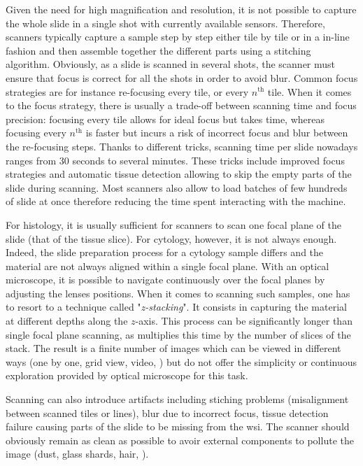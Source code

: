 Given the need for high magnification and resolution, it is not possible to capture the whole slide in a single shot with currently available sensors. Therefore, scanners typically capture a sample step by step either tile by tile or in a in-line fashion and then assemble together the different parts using a stitching algorithm. Obviously, as a slide is scanned in several shots, the scanner must ensure that focus is correct for all the shots in order to avoid blur. Common focus strategies are for instance re-focusing every tile, or every $n^{\text{th}}$ tile. When it comes to the focus strategy, there is usually a trade-off between scanning time and focus precision: focusing every tile allows for ideal focus but takes time, whereas focusing every $n^{\text{th}}$ is faster but incurs a risk of incorrect focus and blur between the re-focusing steps. Thanks to different tricks, scanning time per slide nowadays ranges from 30 seconds to several minutes. These tricks include improved focus strategies and automatic tissue detection allowing to skip the empty parts of the slide during scanning. Most scanners also allow to load batches of few hundreds of slide at once therefore reducing the time spent interacting with the machine.

For histology, it is usually sufficient for scanners to scan one focal plane of the slide (\ie that of the tissue slice). For cytology, however, it is not always enough. Indeed, the slide preparation process for a cytology sample differs and the material are not always aligned within a single focal plane. With an optical microscope, it is possible to navigate continuously over the focal planes by adjusting the lenses positions. When it comes to scanning such samples, one has to resort to a technique called "\textit{z-stacking}". It consists in capturing the material at different depths along the $z$-axis. This process can be significantly longer than single focal plane scanning, as multiplies this time by the number of slices of the stack. The result is a finite number of images which can be viewed in different ways (\eg one by one, grid view, video, \etc) but do not offer the simplicity or continuous exploration provided by optical microscope for this task. 

Scanning can also introduce artifacts including stiching problems (\ie misalignment between scanned tiles or lines), blur due to incorrect focus, tissue detection failure causing parts of the slide to be missing from the \acrshort{wsi}. The scanner should obviously remain as clean as possible to avoir external components to pollute the image (\eg dust, glass shards, hair, \etc). 

